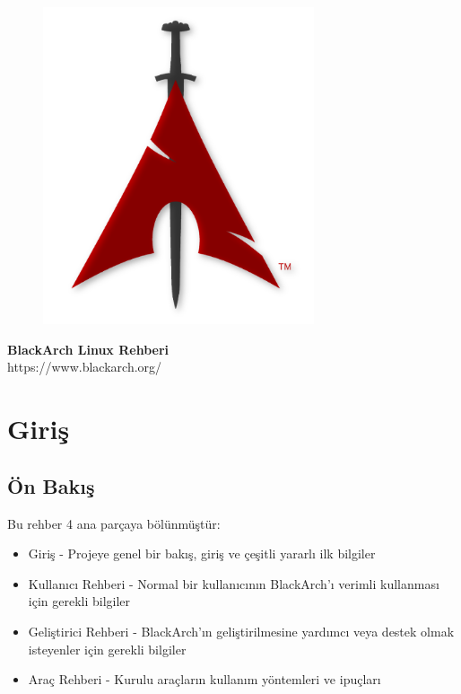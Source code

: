 \documentclass[a4paper, oneside, 11pt]{book}
\begin{document}
\pagestyle{empty}
\begin{center}
\begin{figure}[htbp]
\centering
\vspace{0.5cm}
\includegraphics[width=8cm]{images/logo.png}
\label{fig:logo}
\end{figure}
\vspace{0.5cm}
\Huge{\textbf{BlackArch Linux Rehberi}}\\
\vspace{1cm}
\Large{\color{red}https://www.blackarch.org/}\\
\vspace{0.5cm}
\end{center}
\newpage
\tableofcontents
\newpage
\pagestyle{fancy}


\chapter{Giriş}

\section{Ön Bakış}
Bu rehber 4 ana parçaya bölünmüştür:
\begin{itemize}
\item Giriş - Projeye genel bir bakış, giriş ve çeşitli yararlı ilk bilgiler
\item Kullanıcı Rehberi - Normal bir kullanıcının BlackArch'ı verimli kullanması için gerekli bilgiler
\item Geliştirici Rehberi - BlackArch'ın geliştirilmesine yardımcı veya destek olmak isteyenler için gerekli bilgiler
\item Araç Rehberi - Kurulu araçların kullanım yöntemleri ve ipuçları
\end{itemize}
\end{document}
